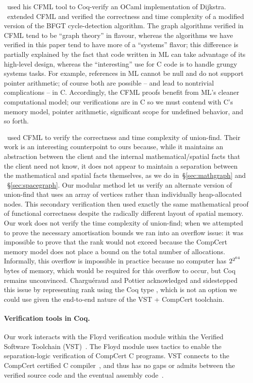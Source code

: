 \cite{char11}~used his CFML tool to Coq-verify an OCaml implementation of 
Dijkstra. 
\cite{gueneauetal19}~extended CFML and verified the correctness 
and time complexity of a modified version of the BFGT cycle-detection algorithm.
The graph algorithms verified in CFML tend to be “graph theory” in flavour, 
whereas the algorithms we have verified in this paper tend to have more of a
“systems” flavor; this difference is partially explained by the fact that 
code written in ML can take advantage of its high-level design, whereas 
the “interesting” use for C code is to handle grungy systems tasks. For 
example, references in ML cannot be null and do not support pointer arithmetic; 
of course both are possible – and lead to nontrivial complications – in 
C. Accordingly, the CFML proofs benefit from ML’s cleaner computational model; 
our verifications are in C so we must contend with C’s memory model, pointer 
arithmetic, significant scope for undefined behavior, and so forth.

\cite{charpott15, charpott19}~used CFML to verify the correctness and 
time complexity of union-find. Their work is an interesting counterpoint to 
ours because, while it maintains an abstraction between the client and the 
internal mathematical/spatial facts that the client need not know, it does 
not appear to maintain a separation between the mathematical and spatial 
facts themselves, as we do in~\S\ref{sec:mathgraph} and ~\S\ref{sec:spacegraph}.
Our modular method let us verify an alternate version of union-find that uses an array of vertices rather than individually heap-allocated nodes. This 
secondary verification then used exactly the same mathematical proof of 
functional correctness despite the radically different layout of spatial 
memory. Our work does not verify the time complexity of union-find; when 
we attempted to prove the necessary amortisation bounds we ran into an 
overflow issue: it was impossible to prove that the rank would not exceed 
 because the CompCert memory model does not place a bound on the 
total number of allocations. Informally, this overflow is impossible in 
practice because no computer has $2^{2^{\tiny 64}}$ bytes of memory, which would 
be required for this overflow to occur, but Coq remains unconvinced. 
Chargu{\'{e}}raud and Pottier acknowledged and sidestepped this issue by 
representing rank using the Coq type , which is not an option we could 
use given the end-to-end nature of the VST + CompCert toolchain.

\paragraph{Verification tools in Coq.}
Our work interacts with the Floyd verification module within the Verified 
Software Toolchain (VST)~\cite{appel:programlogics}. The Floyd module uses 
tactics to enable the separation-logic verification of CompCert C programs. 
VST connects to the CompCert certified C compiler~\cite{leroy:compcert}, and 
thus has no gaps or admits between the verified source code and the eventual
assembly code~\cite{appelvst}.

